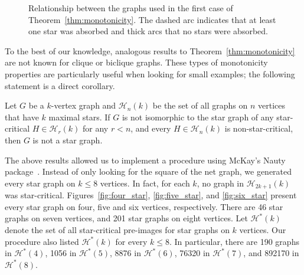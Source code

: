 \begin{figure}[!htb]
        \centering
        \caption{Relationship between the graphs used in the first case of Theorem~\ref{thm:monotonicity}. The dashed arc indicates that at least one star was absorbed and thick arcs that no stars were absorbed.\label{fig:mono}}
\end{figure}

To the best of our knowledge, analogous results to Theorem~\ref{thm:monotonicity} are not known for clique or biclique graphs.
These types of monotonicity properties are particularly useful when looking for small examples; the following statement is a direct corollary.

\begin{corollary}
    \label{cor:frontier}
    Let $G$ be a $k$-vertex graph and $\mathcal{H}_n(k)$ be the set of all graphs on $n$ vertices that have $k$ maximal stars.
    If $G$ is not isomorphic to the star graph of any star-critical $H \in \mathcal{H}_r(k)$ for any $r < n$, and every $H \in \mathcal{H}_n(k)$ is non-star-critical, then $G$ is not a star graph.
\end{corollary}

The above results allowed us to implement a procedure using McKay's Nauty package~\cite{nauty}.
Instead of only looking for the square of the net graph, we generated every star graph on $k \leq 8$ vertices.
In fact, for each $k$, no graph in $\mathcal{H}_{2k+1}(k)$ was star-critical.
Figures~\ref{fig:four_star}, \ref{fig:five_star}, and \ref{fig:six_star} present every star graph on four, five and six vertices, respectively.
There are 46 star graphs on seven vertices, and 201 star graphs on eight vertices.
Let $\mathcal{H}^*(k)$ denote the set of all star-critical pre-images for star graphs on $k$ vertices.
Our procedure also listed $\mathcal{H}^*(k)$ for every $k \leq 8$.
In particular, there are 190 graphs in $\mathcal{H}^*(4)$, 1056 in $\mathcal{H}^*(5)$, 8876 in $\mathcal{H}^*(6)$, 76320 in $\mathcal{H}^*(7)$, and 892170 in $\mathcal{H}^*(8)$.

